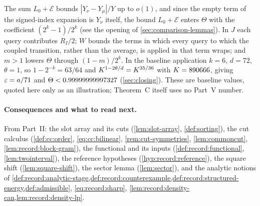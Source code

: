 \begin{remark}\label{rem:cp:reading}
The sum $L_0+\mathcal E$ bounds $|Y_\nu-Y_\mu|/Y$ up to $o(1)$, and
since the empty term of the signed-index expansion is $Y_\nu$
itself, the bound $L_0+\mathcal E$ enters $\Theta$ with the
coefficient $(2^k-1)/2^k$ (see the opening of
\cref{sec:comparison-lemmas}). In $J$ each query contributes
$R_I/2$; $W$ bounds the terms in which every query to which the
coupled transition, rather than the average, is applied in that
term wraps; and
$m>1$ lowers $\Theta$ through $(1-m)/2^k$. In the baseline
application $k=6$, $d=72$, $\theta=1$, so $1-2^{-k}=63/64$ and
$K^{1-2\theta/d}=K^{35/36}$ with $K=890666$, giving
$\varepsilon=a/71$ and $\Theta<0.99999999997327$ (\cref{sec:closing}). These are
baseline values, quoted here only as an illustration; Theorem~C
itself uses no Part~V number.
\end{remark}

\paragraph{Consequences and what to read next.}
From Part~II: the slot array and its cuts (\cref{lem:slot-array},
\cref{def:sorting}), the cut calculus (\cref{def:cc:order},
\cref{eq:cc:bilinear}, \cref{rem:cut-symmetries}, \cref{lem:commoncut},
\cref{lem:record:block-gram}), the
functional and its inputs (\cref{def:record:functional},
\cref{lem:twointerval}), the reference hypotheses
(\cref{hyp:record:reference}), the square shift (\cref{lem:square-shift}), the
sector lemma (\cref{lem:sector}), and the analytic notions of
\cref{def:record:analytic-stage,def:record:counterexample,def:record:structured-energy,def:admissible},
\cref{eq:record:sharp}, \cref{lem:record:density-can,lem:record:density-lp}.
